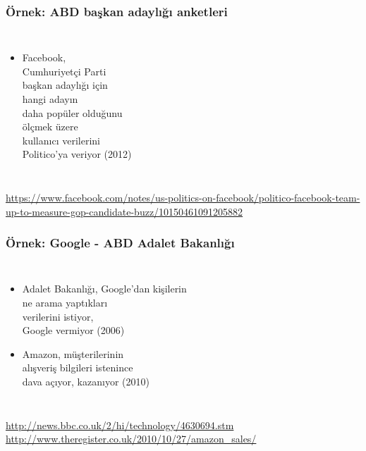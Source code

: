 \documentclass[dvipsnames]{beamer}
\theoremstyle{definition}
\theoremstyle{example}
\theoremstyle{plain}
\begin{document}
\begin{frame}
  \frametitle{Örnek: ABD başkan adaylığı anketleri}

  \begin{columns}

    \begin{itemize}
      \item Facebook,\\
        Cumhuriyetçi Parti\\
        başkan adaylığı için\\
        hangi adayın\\
        daha popüler olduğunu\\
        ölçmek üzere\\
        kullanıcı verilerini\\
        Politico'ya veriyor (2012)
    \end{itemize}
  \end{columns}

  \medskip
  \tiny{\url{https://www.facebook.com/notes/us-politics-on-facebook/politico-facebook-team-up-to-measure-gop-candidate-buzz/10150461091205882}}\\
\end{frame}

\begin{frame}
  \frametitle{Örnek: Google - ABD Adalet Bakanlığı}

  \begin{columns}

    \begin{itemize}
      \item Adalet Bakanlığı, Google'dan kişilerin\\
        ne arama yaptıkları\\
        verilerini istiyor,\\
        Google vermiyor (2006)

      \pause
      \item Amazon, müşterilerinin\\
        alışveriş bilgileri istenince\\
        dava açıyor, kazanıyor (2010)
    \end{itemize}
  \end{columns}

  \medskip
  \tiny{\url{http://news.bbc.co.uk/2/hi/technology/4630694.stm}}\\
  \tiny{\url{http://www.theregister.co.uk/2010/10/27/amazon_sales/}}\\
\end{frame}
\end{document}

